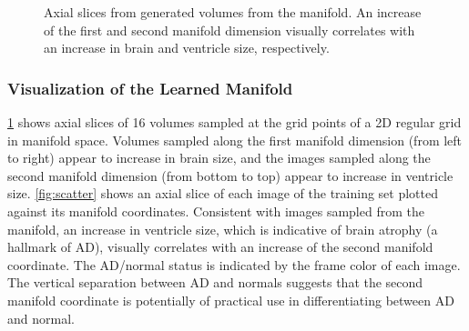 \begin{figure}[tb!]
\centering
  

\caption[Axial slices from generated volumes from the manifold]{Axial slices
from generated volumes from the manifold. An increase of the first and second manifold dimension visually correlates with an increase in
brain and ventricle size, respectively.}
\label{fig:generated}
\end{figure}

\subsubsection{Visualization of the Learned Manifold}

\ref{fig:generated} shows axial slices of 16 volumes sampled at the grid points
of a 2D regular grid in manifold space. Volumes sampled along the first manifold
dimension (from left to right) appear to increase in brain size, and the images
sampled along the second manifold dimension (from bottom to top) appear to
increase in ventricle size. \ref{fig:scatter} shows an axial slice of each image
of the training set plotted against its manifold coordinates.
Consistent with images sampled from the manifold, an increase in ventricle size,
which is indicative of brain atrophy (a hallmark of AD), visually correlates
with an increase of the second manifold coordinate. The AD/normal status is
indicated by the frame color of each image. The vertical separation between AD
and normals suggests that the second manifold coordinate is potentially of
practical use in differentiating between AD and normal.


